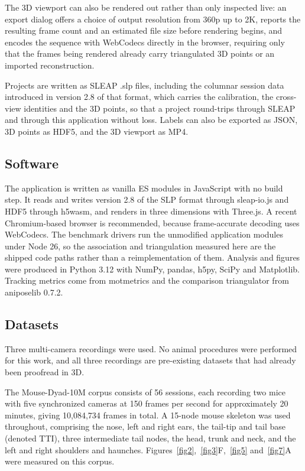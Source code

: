\documentclass[pdflatex, sn-nature]{sn-jnl}
\theoremstyle{thmstyleone}%
\theoremstyle{thmstyletwo}%
\theoremstyle{thmstylethree}%
\begin{document}
The 3D viewport can also be rendered out rather than only inspected live: an export dialog offers a choice of output resolution from 360p up to 2K, reports the resulting frame count and an estimated file size before rendering begins, and encodes the sequence with WebCodecs directly in the browser, requiring only that the frames being rendered already carry triangulated 3D points or an imported reconstruction.

Projects are written as SLEAP .slp files, including the columnar session data introduced in version 2.8 of that format, which carries the calibration, the cross-view identities and the 3D points, so that a project round-trips through SLEAP and through this application without loss. Labels can also be exported as JSON, 3D points as HDF5, and the 3D viewport as MP4.

\subsection{Software}\label{methods-software}

The application is written as vanilla ES modules in JavaScript with no build step. It reads and writes version 2.8 of the SLP format through sleap-io.js and HDF5 through h5wasm, and renders in three dimensions with Three.js. A recent Chromium-based browser is recommended, because frame-accurate decoding uses WebCodecs. The benchmark drivers run the unmodified application modules under Node 26, so the association and triangulation measured here are the shipped code paths rather than a reimplementation of them. Analysis and figures were produced in Python 3.12 with NumPy, pandas, h5py, SciPy and Matplotlib. Tracking metrics come from motmetrics and the comparison triangulator from aniposelib 0.7.2.

\subsection{Datasets}\label{methods-datasets}

Three multi-camera recordings were used. No animal procedures were performed for this work, and all three recordings are pre-existing datasets that had already been proofread in 3D.

The Mouse-Dyad-10M corpus consists of 56 sessions, each recording two mice with five synchronized cameras at 150 frames per second for approximately 20 minutes, giving 10,084,734 frames in total. A 15-node mouse skeleton was used throughout, comprising the nose, left and right ears, the tail-tip and tail base (denoted TTI), three intermediate tail nodes, the head, trunk and neck, and the left and right shoulders and haunches. Figures~\ref{fig2},~\ref{fig3}F,~\ref{fig5} and~\ref{fig7}A were measured on this corpus.
\end{document}
